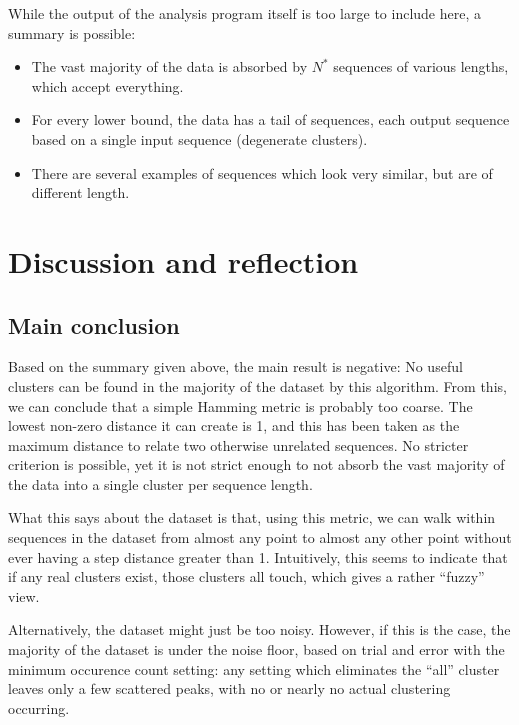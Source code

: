 \documentclass[fleqn]{book}
\providecommand{\tightlist}{%
  \setlength{\itemsep}{0pt}\setlength{\parskip}{0pt}}
\begin{document}
While the output of the analysis program itself is too large to include
here, a summary is possible:

\begin{itemize}
\tightlist
\item
  The vast majority of the data is absorbed by \(N^*\) sequences of
  various lengths, which accept everything.
\item
  For every lower bound, the data has a tail of sequences, each output
  sequence based on a single input sequence (degenerate clusters).
\item
  There are several examples of sequences which look very similar, but
  are of different length.
\end{itemize}

\chapter{Discussion and reflection}\label{discussion-and-reflection}

\section{Main conclusion}\label{main-conclusion}

Based on the summary given above, the main result is negative: No useful
clusters can be found in the majority of the dataset by this algorithm.
From this, we can conclude that a simple Hamming metric is probably too
coarse. The lowest non-zero distance it can create is 1, and this has
been taken as the maximum distance to relate two otherwise unrelated
sequences. No stricter criterion is possible, yet it is not strict
enough to not absorb the vast majority of the data into a single cluster
per sequence length.

What this says about the dataset is that, using this metric, we can walk
within sequences in the dataset from almost any point to almost any
other point without ever having a step distance greater than 1.
Intuitively, this seems to indicate that if any real clusters exist,
those clusters all touch, which gives a rather ``fuzzy'' view.

Alternatively, the dataset might just be too noisy. However, if this is
the case, the majority of the dataset is under the noise floor, based on
trial and error with the minimum occurence count setting: any setting
which eliminates the ``all'' cluster leaves only a few scattered peaks,
with no or nearly no actual clustering occurring.
\end{document}

